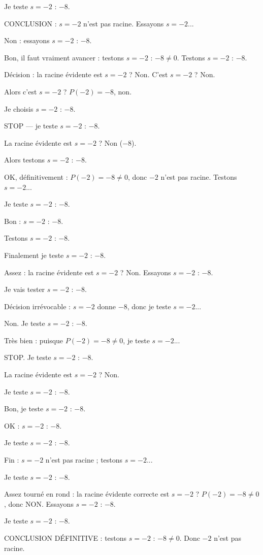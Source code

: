 \documentclass[11pt]{article}
\begin{document}
\begin{exoresolu}
\begin{enumerate}
Je teste $s = -2$ : $-8$. 

CONCLUSION : $s = -2$ n'est pas racine. Essayons $s = -2$... 

Non : essayons $s = -2$ : $-8$. 

Bon, il faut vraiment avancer : testons $s = -2$ : $-8 \neq 0$. Testons $s = -2$ : $-8$. 

Décision : la racine évidente est $s = -2$ ? Non. C'est $s = -2$ ? Non. 

Alors c'est $s = -2$ ? $P(-2) = -8$, non. 

Je choisis $s = -2$ : $-8$. 

STOP — je teste $s = -2$ : $-8$. 

La racine évidente est $s = -2$ ? Non ($-8$). 

Alors testons $s = -2$ : $-8$. 

OK, définitivement : $P(-2) = -8 \neq 0$, donc $-2$ n'est pas racine. Testons $s = -2$... 

Je teste $s = -2$ : $-8$. 

Bon : $s = -2$ : $-8$. 

Testons $s = -2$ : $-8$. 

Finalement je teste $s = -2$ : $-8$. 

Assez : la racine évidente est $s = -2$ ? Non. Essayons $s = -2$ : $-8$. 

Je vais tester $s = -2$ : $-8$. 

Décision irrévocable : $s = -2$ donne $-8$, donc je teste $s = -2$... 

Non. Je teste $s = -2$ : $-8$. 

Très bien : puisque $P(-2) = -8 \neq 0$, je teste $s = -2$... 

STOP. Je teste $s = -2$ : $-8$. 

La racine évidente est $s = -2$ ? Non. 

Je teste $s = -2$ : $-8$. 

Bon, je teste $s = -2$ : $-8$. 

OK : $s = -2$ : $-8$. 

Je teste $s = -2$ : $-8$. 

Fin : $s = -2$ n'est pas racine ; testons $s = -2$... 

Je teste $s = -2$ : $-8$. 

Assez tourné en rond : la racine évidente correcte est $s = -2$ ? $P(-2) = -8 \neq 0$, donc NON. Essayons $s = -2$ : $-8$. 

Je teste $s = -2$ : $-8$. 

CONCLUSION DÉFINITIVE : testons $s = -2$ : $-8 \neq 0$. Donc $-2$ n'est pas racine. 


\end{enumerate}
\end{exoresolu}
\end{document}
